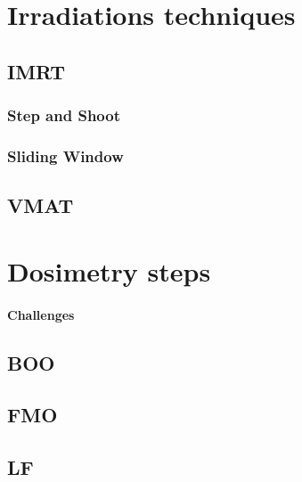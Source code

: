 \section{Irradiations techniques}
\subsection{IMRT}
\subsubsection{Step and Shoot}
\subsubsection{Sliding Window}
\subsection{VMAT}

\section{Dosimetry steps}
\paragraph{Challenges}
\subsection{BOO}
\subsection{FMO}
\subsection{LF}
